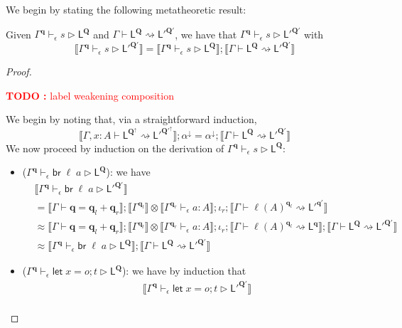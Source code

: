 \documentclass[acmsmall,screen,review]{acmart}
\newcounter{todos}
\newcommand{\TODO}[1]{{
  \stepcounter{todos}
  \begin{center}\large{\textcolor{red}{\textbf{TODO \arabic{todos}:} #1}}\end{center}
}}
\newcommand{\mb}[1]{\ensuremath{\mathbf{#1}}}
\newcommand{\ms}[1]{\ensuremath{\mathsf{#1}}}
\newcommand{\letstmt}[3]{\ensuremath{\ms{let}\;#1 = #2; #3}}
\newcommand{\brb}[2]{\ms{br}\;#1\;#2}
\newcommand{\qsp}[4]{#1 \vdash #2 = #3 + #4}
\newcommand{\lwk}[3]{#1 \vdash #2 \rightsquigarrow #3}
\newcommand{\hasty}[4]{#1 \vdash_{#2} #3: {#4}}
\newcommand{\haslb}[4]{#1 \vdash_{#2} #3 \rhd #4}
\newcommand{\dnt}[1]{\llbracket{#1}\rrbracket}
\newcommand{\zeroqv}[1]{#1^\uparrow}
\begin{document}
We begin by stating the following metatheoretic result:
\begin{lemma}
  Given $\haslb{\Gamma^{\mb{q}}}{\epsilon}{s}{\ms{L}^{\mb{Q}}}$ and 
  $\lwk{\Gamma}{\ms{L}^{\mb{Q}}}{\ms{L}'^{\mb{Q}'}}$, we have that
  $\haslb{\Gamma^{\mb{q}}}{\epsilon}{s}{\ms{L}'^{\mb{Q}'}}$ with
  $$
  \dnt{\haslb{\Gamma^{\mb{q}}}{\epsilon}{s}{\ms{L}'^{\mb{Q}'}}}
  = \dnt{\haslb{\Gamma^{\mb{q}}}{\epsilon}{s}{\ms{L}^{\mb{Q}}}}
  ; \dnt{\lwk{\Gamma}{\ms{L}^{\mb{Q}}}{\ms{L}'^{\mb{Q}'}}}
  $$
\end{lemma}
\begin{proof}
  \TODO{label weakening composition}
  We begin by noting that, via a straightforward induction,
  \begin{equation*}
  \dnt{\lwk{\Gamma, x : A}{\ms{L}^{\zeroqv{\mb{Q}}}}{\ms{L}'^{\zeroqv{\mb{Q}'}}}} 
  ; \alpha^\downarrow
  =
  \alpha^\downarrow ; \dnt{\lwk{\Gamma}{\ms{L}^{\mb{Q}}}{\ms{L}'^{\mb{Q}'}}}
  \end{equation*}
  We now proceed by induction on the derivation of
  $\haslb{\Gamma^{\mb{q}}}{\epsilon}{s}{\ms{L}^{\mb{Q}}}$:
  \begin{itemize}
    \item ($\haslb{\Gamma^{\mb{q}}}{\epsilon}{\brb{\ell}{a}}{\ms{L}^{\mb{Q}}}$):
    we have
    \begin{align*}
    &\dnt{\haslb{\Gamma^{\mb{q}}}{\epsilon}{\brb{\ell}{a}}{\ms{L}'^{\mb{Q}'}}} \\
    &= \dnt{\qsp{\Gamma}{\mb{q}}{\mb{q}_l}{\mb{q}_r}} 
      ; \dnt{\Gamma^{\mb{q}_l}} \otimes \dnt{\hasty{\Gamma^{\mb{q}_r}}{\epsilon}{a}{A}} 
      ; \iota_r
      ; \dnt{\lwk{\Gamma}{\ell(A)^{\mb{q}_l}}{\ms{L}'^{\mb{q'}}}} \\ 
    &\approx \dnt{\qsp{\Gamma}{\mb{q}}{\mb{q}_l}{\mb{q}_r}} 
      ; \dnt{\Gamma^{\mb{q}_l}} \otimes \dnt{\hasty{\Gamma^{\mb{q}_r}}{\epsilon}{a}{A}} 
      ; \iota_r
      ; \dnt{\lwk{\Gamma}{\ell(A)^{\mb{q}_l}}{\ms{L}^{\mb{q}}}}
      ; \dnt{\lwk{\Gamma}{\ms{L}^{\mb{Q}}}{\ms{L}'^{\mb{Q}'}}} \\
    &\approx \dnt{\haslb{\Gamma^{\mb{q}}}{\epsilon}{\brb{\ell}{a}}{\ms{L}^{\mb{Q}}}}
      ; \dnt{\lwk{\Gamma}{\ms{L}^{\mb{Q}}}{\ms{L}'^{\mb{Q}'}}}
    \end{align*}
    \item ($\haslb{\Gamma^{\mb{q}}}{\epsilon}{\letstmt{x}{o}{t}}{\ms{L}^{\mb{Q}}}$):
    we have by induction that
    \begin{align*}
    &\dnt{\haslb{\Gamma^{\mb{q}}}{\epsilon}{\letstmt{x}{o}{t}}{\ms{L}'^{\mb{Q}'}}} \\

\end{align*}
\end{itemize}
\end{proof}
\end{document}
